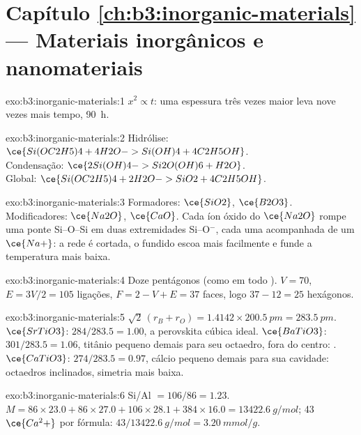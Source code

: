 \section*{Capítulo \ref{ch:b3:inorganic-materials} --- Materiais inorgânicos e nanomateriais}

\begin{solution}{exo:b3:inorganic-materials:1}
$x^2 \propto t$: uma espessura três vezes maior leva nove vezes mais tempo, \qty{90}{h}.
\end{solution}

\begin{solution}{exo:b3:inorganic-materials:2}
Hidrólise: $\ce{Si(OC2H5)4 + 4H2O -> Si(OH)4 + 4C2H5OH}$.\\
Condensação: $\ce{2Si(OH)4 -> Si2O(OH)6 + H2O}$.\\
Global: $\ce{Si(OC2H5)4 + 2H2O -> SiO2 + 4C2H5OH}$.
\end{solution}

\begin{solution}{exo:b3:inorganic-materials:3}
Formadores: $\ce{SiO2}$, $\ce{B2O3}$. Modificadores: $\ce{Na2O}$, $\ce{CaO}$. Cada íon óxido do $\ce{Na2O}$ rompe uma ponte Si--O--Si
em duas extremidades Si--O$^-$, cada uma acompanhada de um $\ce{Na+}$: a rede é cortada, o fundido
escoa mais facilmente e funde a temperatura mais baixa.
\end{solution}

\begin{solution}{exo:b3:inorganic-materials:4}
Doze pentágonos (como em todo ). $V = 70$, $E = 3V/2 = 105$ ligações, $F = 2 - V + E = 37$
faces, logo $37 - 12 = 25$ hexágonos.
\end{solution}

\begin{solution}{exo:b3:inorganic-materials:5}
$\sqrt2\,(r_B + r_O) = 1.4142 \times \qty{200.5}{pm} = \qty{283.5}{pm}$. $\ce{SrTiO3}$: $284/283.5 = 1.00$, a perovskita cúbica ideal.
$\ce{BaTiO3}$: $301/283.5 = 1.06$, titânio pequeno demais para seu octaedro, fora do centro: .
$\ce{CaTiO3}$: $274/283.5 = 0.97$, cálcio pequeno demais para sua cavidade: octaedros inclinados, simetria
mais baixa.
\end{solution}

\begin{solution}{exo:b3:inorganic-materials:6}
Si/Al $= 106/86 = 1.23$. $M = 86 \times 23.0 + 86 \times 27.0 + 106 \times 28.1 + 384 \times 16.0 = \qty{13422.6}{g/mol}$; 43 $\ce{Ca^2+}$ por
fórmula: $43/\qty{13422.6}{g/mol} = \qty{3.20}{mmol/g}$.
\end{solution}

